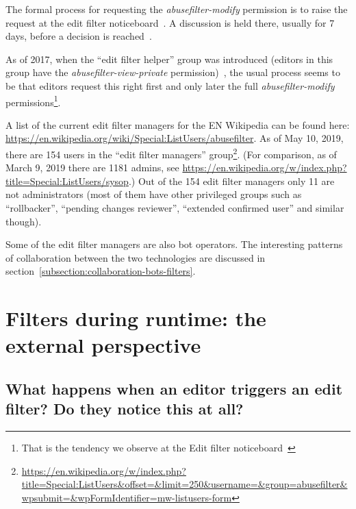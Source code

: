 The formal process for requesting the \emph{abusefilter-modify} permission is to raise the request at the edit filter noticeboard~\cite{Wikipedia:EditFilterNoticeboard}.
A discussion is held there, usually for 7 days, before a decision is reached~\cite{Wikipedia:EditFilter}.

As of 2017, when the ``edit filter helper'' group was introduced (editors in this group have the \emph{abusefilter-view-private} permission)~\cite{Wikipedia:EditFilterHelper},
the usual process seems to be that editors request this right first and only later the full \emph{abusefilter-modify} permissions\footnote{That is the tendency we observe at the Edit filter noticeboard~\cite{Wikipedia:EditFilterNoticeboard}}.

A list of the current edit filter managers for the EN Wikipedia can be found here: \url{https://en.wikipedia.org/wiki/Special:ListUsers/abusefilter}.
As of May 10, 2019, there are 154 users in the ``edit filter managers'' group\footnote{\url{https://en.wikipedia.org/w/index.php?title=Special:ListUsers&offset=&limit=250&username=&group=abusefilter&wpsubmit=&wpFormIdentifier=mw-listusers-form}}.
(For comparison, as of March 9, 2019 there are 1181 admins, see \url{https://en.wikipedia.org/w/index.php?title=Special:ListUsers/sysop}.)
Out of the 154 edit filter managers only 11 are not administrators (most of them have other privileged groups such as ``rollbacker'', ``pending changes reviewer'', ``extended confirmed user'' and similar though).

Some of the edit filter managers are also bot operators.
The interesting patterns of collaboration between the two technologies are discussed in section~\ref{subsection:collaboration-bots-filters}.


\section{Filters during runtime: the external perspective}


\subsection{What happens when an editor triggers an edit filter? Do they notice this at all?}


